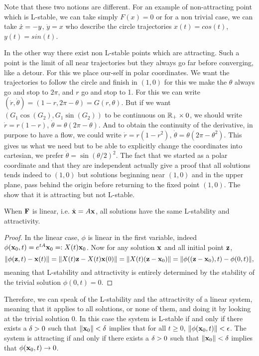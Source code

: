 \begin{remarque} \label{rem:stabilité}
Note that these two notions are different. For an example of non-attracting point which is L-stable, we can take simply $F(x)=0$ or for a non trivial case, we can take $\dot{x} = -y$, $\dot{y} = x$ who describe the circle trajectories $x(t)=cos(t)$, $y(t)=sin(t)$.

In the other way there exist non L-stable points which are attracting. Such a point is the limit of all near trajectories but they always go far before converging, like a detour. For this we place our-self in polar coordinates. We want the trajectories to follow the circle and finish in $(1,0)$ for this we make the $\theta$ always go and stop to $2\pi$, and $r$ go and stop to 1. For this we can write $(\dot{r},\dot{\theta})=(1-r,2\pi-\theta) = G(r,\theta)$. But if we want $(G_1\cos(G_2),G_1\sin(G_2))$ to be continuous on $\mathbb{R}_+\times 0$, we should write $\dot{r} = r(1-r)$, $\dot{\theta} = \theta(2\pi-\theta)$. And to obtain the continuity of the derivative, in purpose to have a flow, we could write $\dot{r} = r(1-r^2)$, $\dot{\theta} = \theta(2\pi-\theta^2)$. This gives us what we need but to be able to explicitly change the coordinates into cartesian, we prefer $\dot{\theta} = \sin(\theta/2)^2$. The fact that we started as a polar coordinate and that they are independent actually give a proof that all solutions tends indeed to $(1,0)$ but solutions beginning near $(1,0)$ and in the upper plane, pass behind the origin before returning to the fixed point $(1,0)$. The show that it is attracting but not L-stable. 
\end{remarque}
\begin{lemme}
    When $\mathbf{F}$ is linear, i.e. $\dot{\mathbf{x}}=A\mathbf{x}$, all solutions have the same L-stability and attractivity.
\end{lemme}
\begin{proof}
In the linear case, $\phi$ is linear in the first variable, indeed $\phi(\mathbf{x}_0,t) = e^{tA}\mathbf{x}_0 =: X(t)\mathbf{x}_0$. Now for any solution $\mathbf{x}$ and all initial point $\mathbf{z}$,
\[ \|\phi(\mathbf{z},t)-\mathbf{x}(t)\| = \|X(t)\mathbf{z}-X(t)\mathbf{x}(0)\| = \|X(t)(\mathbf{z}-\mathbf{x}_0)\| =\|\phi((\mathbf{z}-\mathbf{x}_0),t)-\phi(0,t)\|, \] meaning that L-stability and attractivity is entirely determined by the stability of the trivial solution $\phi(0,t)=0$.
\end{proof}
\begin{remarque}
    Therefore, we can speak of the L-stability and the attractivity of a linear system, meaning that it applies to all solutions, or none of them, and doing it by looking at the trivial solution 0. In this case the system is L-stable if and only if there exists a $\delta>0$ such that $\|\mathbf{x}_0\|<\delta$ implies that for all $t\geq0$, $\|\phi(\mathbf{x}_0,t)\|<\epsilon$. The system is attracting if and only if there exists a $\delta>0$ such that $\|\mathbf{x}_0\|<\delta$ implies that $\phi(\mathbf{x}_0,t) \to 0$.
\end{remarque}
 
